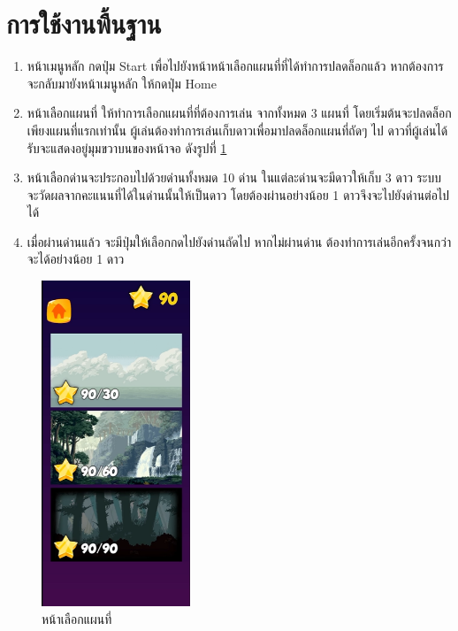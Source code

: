 \section{การใช้งานพื้นฐาน}
\begin{enumerate}
    \item หน้าเมนูหลัก กดปุ่ม Start เพื่อไปยังหน้าหน้าเลือกแผนที่ที่ได้ทำการปลดล็อกแล้ว หากต้องการจะกลับมายังหน้าเมนูหลัก ให้กดปุ่ม Home
    \item หน้าเลือกแผนที่ ให้ทำการเลือกแผนที่ที่ต้องการเล่น จากทั้งหมด 3 แผนที่ โดยเริ่มต้นจะปลดล็อกเพียงแผนที่แรกเท่านั้น ผู้เล่นต้องทำการเล่นเก็บดาวเพื่อมาปลดล็อกแผนที่ถัดๆ ไป ดาวที่ผู้เล่นได้รับจะแสดงอยู่มุมขวาบนของหน้าจอ ดังรูปที่ \ref{mapselection}
    \item หน้าเลือกด่านจะประกอบไปด้วยด่านทั้งหมด 10 ด่าน ในแต่ละด่านจะมีดาวให้เก็บ 3 ดาว ระบบจะวัดผลจากคะแนนที่ได้ในด่านนั้นให้เป็นดาว โดยต้องผ่านอย่างน้อย 1 ดาวจึงจะไปยังด่านต่อไปได้
    \item เมื่อผ่านด่านแล้ว จะมีปุ่มให้เลือกกดไปยังด่านถัดไป หากไม่ผ่านด่าน ต้องทำการเล่นอีกครั้งจนกว่าจะได้อย่างน้อย 1 ดาว
\end{enumerate}

\begin{figure}[h!]
    \begin{center}
    \includegraphics[width=1.75in]{pic/MapSelection.png}
    \end{center}
    \caption[หน้าเลือกแผนที่]{หน้าเลือกแผนที่}
    \label{mapselection}
    \end{figure}

